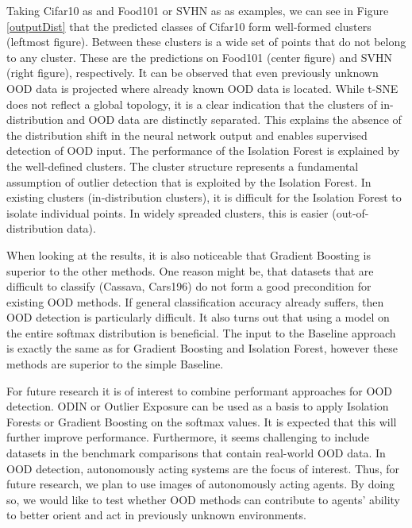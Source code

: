 \documentclass{article}
\begin{document}
Taking Cifar10 as  and Food101 or SVHN as  as examples, we can see in Figure \ref{outputDist} that the predicted classes of Cifar10 form well-formed clusters (leftmost figure). Between these clusters is a wide set of points that do not belong to any cluster. These are the predictions on Food101 (center figure) and SVHN (right figure), respectively. It can be observed that even previously unknown OOD data is projected where already known OOD data is located. While t-SNE does not reflect a global topology, it is a clear indication that the clusters of in-distribution and OOD data are distinctly separated. This explains the absence of the distribution shift in the neural network output and enables supervised detection of OOD input. The performance of the Isolation Forest is explained by the well-defined clusters. The cluster structure represents a fundamental assumption of outlier detection that is exploited by the Isolation Forest. In existing clusters (in-distribution clusters), it is difficult for the Isolation Forest to isolate individual points. In widely spreaded clusters, this is easier (out-of-distribution data).

When looking at the results, it is also noticeable that Gradient Boosting is superior to the other methods. One reason might be, that datasets that are difficult to classify (Cassava, Cars196) do not form a good precondition for existing OOD methods. If general classification accuracy already suffers, then OOD detection is particularly difficult. It also turns out that using a model on the entire softmax distribution is beneficial. The input to the Baseline approach is exactly the same as for Gradient Boosting and Isolation Forest, however these methods are superior to the simple Baseline.

For future research it is of interest to combine performant approaches for OOD detection. ODIN or Outlier Exposure can be used as a basis to apply Isolation Forests or Gradient Boosting on the softmax values. It is expected that this will further improve performance. Furthermore, it seems challenging to include datasets in the benchmark comparisons that contain real-world OOD data. In OOD detection, autonomously acting systems are the focus of interest. Thus, for future research, we plan to use images of autonomously acting agents. By doing so, we would like to test whether OOD methods can contribute to agents' ability to better orient and act in previously unknown environments.


  
\end{document}
